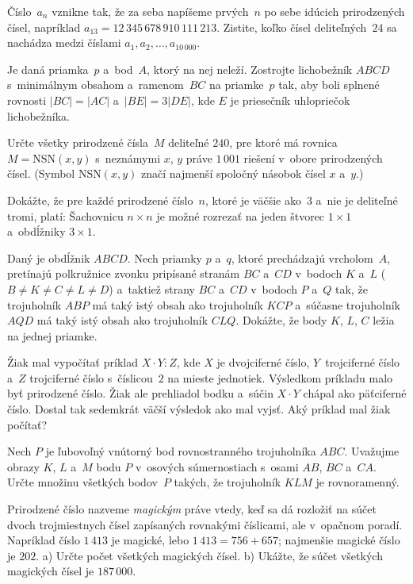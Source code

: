 {%
Číslo~$a_n$ vznikne tak, že za seba napíšeme prvých~$n$ po sebe
idúcich prirodzených čísel, napríklad
$a_{13}=12\,345\,678\,910\,111\,213$. Zistite, koľko čísel
deliteľných~$24$ sa nachádza medzi číslami $a_1,a_2,\dots,a_{10\,000}$.}

{%
Je daná priamka~$p$ a~bod~$A$, ktorý na nej neleží. Zostrojte lichobežník
$ABCD$ s~minimálnym obsahom a~ramenom~$BC$ na priamke~$p$ tak, aby boli splnené rovnosti
$|BC|=|AC|$ a~$|BE|=3|DE|$, kde $E$ je priesečník uhlopriečok lichobežníka.}

{%
Určte všetky prirodzené čísla~$M$ deliteľné $240$, pre ktoré má
rovnica $M=\text{NSN}(x,y)$ s~neznámymi $x$, $y$ práve
$1\,001$ riešení v~obore prirodzených čísel. (Symbol $\text{NSN}(x,y)$ značí
najmenší spoločný násobok čísel $x$ a~$y$.)}

{%
Dokážte, že pre každé prirodzené číslo~$n$, ktoré je väčšie ako~$3$
a~nie je deliteľné tromi, platí:
Šachovnicu $n\times n$ je možné rozrezať na jeden štvorec
$1\times1$ a~obdĺžniky $3\times1$.}

{%
Daný je obdĺžnik $ABCD$. Nech priamky $p$ a~$q$, ktoré
prechádzajú vrcholom~$A$, pretínajú polkružnice zvonku pripísané
stranám $BC$ a~$CD$ v~bodoch $K$ a~$L$
($B\ne K\ne C\ne L\ne D$) a~taktiež strany $BC$ a~$CD$
v~bodoch $P$ a~$Q$ tak, že trojuholník $ABP$ má taký istý obsah ako
trojuholník $KCP$ a~súčasne trojuholník $AQD$ má taký istý obsah
ako trojuholník $CLQ$. Dokážte, že body $K$, $L$, $C$ ležia na
jednej priamke.}

{%
Žiak mal vypočítať príklad $X\cdot Y:Z$, kde $X$ je dvojciferné
číslo, $Y$~trojciferné číslo a~$Z$ trojciferné číslo s~číslicou~$2$
na mieste jednotiek. Výsledkom príkladu malo byť prirodzené číslo. Žiak
ale prehliadol bodku a~súčin $X\cdot Y$ chápal ako päťciferné
číslo. Dostal tak sedemkrát väčší výsledok ako mal vyjsť.
Aký príklad mal žiak počítať?}

{%
Nech $P$ je ľubovoľný vnútorný bod rovnostranného trojuholníka
$ABC$. Uvažujme
obrazy $K$, $L$ a~$M$ bodu $P$ v~osových súmernostiach s~osami
$AB$, $BC$ a~$CA$. Určte množinu všetkých bodov~$P$ takých, že
trojuholník $KLM$ je rovnoramenný.}

{%
Prirodzené číslo nazveme {\it magickým} práve vtedy, keď sa dá
rozložiť na súčet dvoch trojmiestnych čísel zapísaných rovnakými
číslicami, ale v~opačnom poradí. Napríklad číslo $1\,413$ je
magické, lebo $1\,413=756+657$; najmenšie magické číslo je
$202$.
\ite a) Určte počet všetkých magických čísel.
\ite b) Ukážte, že súčet všetkých magických čísel je $187\,000$.}

